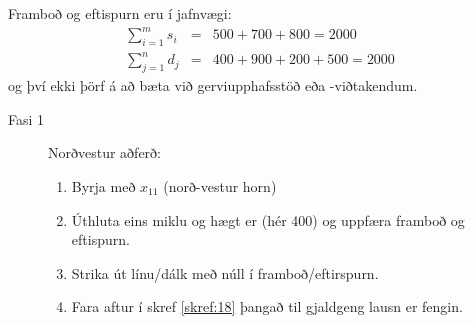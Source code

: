 \begin{lausn}Framboð og eftispurn eru í jafnvægi:
\begin{eqnarray*}
 \sum_{i=1}^m s_i &=&500+700+800=2000\\
 \sum_{j=1}^n d_j &=& 400+900+200+500=2000
\end{eqnarray*}
og því ekki þörf á að bæta við gerviupphafsstöð eða -viðtakendum.

\begin{description}
 \item[Fasi 1] Norðvestur aðferð:
 \begin{enumerate}[label=(\roman{*})]
  \item Byrja með $x_{11}$ (norð-vestur horn)
  \item\label{skref:18} Úthluta eins miklu og hægt er (hér 400) og uppfæra framboð og eftispurn.
  \item Strika út línu/dálk með núll í framboð/eftirspurn.
  \item Fara aftur í skref \ref{skref:18} þangað til gjaldgeng lausn er fengin.
 \end{enumerate}

\begin{center}


\end{center}
\end{description}
\end{lausn}
